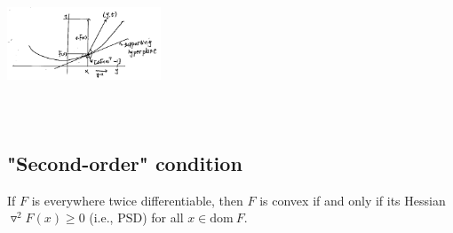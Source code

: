 \begin{marginfigure}
	\centering
	\includegraphics[width=1.8in,height=1.8in]{figures/ch08/figure1106_3.png}
\end{marginfigure}

\subsection{"Second-order" condition}

\begin{theorem}
	If $F$ is everywhere twice differentiable, then $F$ is convex if and only if its Hessian $\triangledown^2F(x)\geq 0$ (i.e., PSD) for all $x\in \text{dom}\ F$.
\end{theorem}


